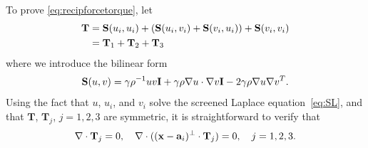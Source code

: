 \documentclass[lineno]{jfm}
\renewcommand{\aa}{\mathbf{a}}
\newcommand{\bd}{\partial}
\newcommand{\FF}{\mathbf{F}}
\newcommand{\JJ}{\mathbf{J}}
\newcommand{\nnu}{\boldsymbol{\nu}}
\newcommand{\ttau}{\boldsymbol{\tau}}
\newcommand{\xx}{\mathbf{x}}
\newcommand{\yy}{\mathbf{y}}
\newcommand{\pderiv}[2]{\frac{\partial #1}{\partial #2}}
\begin{document}

To prove \eqref{eq:recipforcetorque}, let 
\begin{align*}
  {\bf T} &=
    \mathbf{S}(u_i,u_i)
  +(\mathbf{S}(u_i,v_i)
  +\mathbf{S}(v_i,u_i))
  +\mathbf{S}(v_i,v_i) \\
  &= {\bf T}_1 + {\bf T}_2 + {\bf T}_3
\end{align*}
where we introduce the bilinear form
\begin{equation}
\label{eq:Tsplit}
\mathbf{S}(u,v)
=  \gamma\rho^{-1} uv {\bf I} + \gamma\rho \nabla u \cdot \nabla v {\bf I} - 2 \gamma \rho \nabla u \nabla v^T .
\end{equation}
Using the fact that $u$,  $u_i$, and $v_i$ solve the screened Laplace
equation~\eqref{eq:SL},  and that $\mathbf{T}$, $\mathbf{T}_j$, $j = 1,
2, 3$ are symmetric, it is straightforward to verify that 
  \begin{equation}
    \label{eq:decompdivfree}
    \nabla \cdot {\bf T}_j = 0, \quad
    \nabla \cdot ((\xx-\aa_i)^{\perp} \cdot {\bf T}_j) = 0, \quad j = 1, 2, 3.
  \end{equation}
\end{document}
